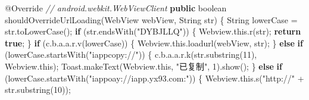 \documentclass[
]{article}
\newenvironment{Shaded}{}{}
\newcommand{\AttributeTok}[1]{\textcolor[rgb]{0.49,0.56,0.16}{#1}}
\newcommand{\BuiltInTok}[1]{\textcolor[rgb]{0.00,0.50,0.00}{#1}}
\newcommand{\CommentTok}[1]{\textcolor[rgb]{0.38,0.63,0.69}{\textit{#1}}}
\newcommand{\ControlFlowTok}[1]{\textcolor[rgb]{0.00,0.44,0.13}{\textbf{#1}}}
\newcommand{\DataTypeTok}[1]{\textcolor[rgb]{0.56,0.13,0.00}{#1}}
\newcommand{\DecValTok}[1]{\textcolor[rgb]{0.25,0.63,0.44}{#1}}
\newcommand{\FunctionTok}[1]{\textcolor[rgb]{0.02,0.16,0.49}{#1}}
\newcommand{\KeywordTok}[1]{\textcolor[rgb]{0.00,0.44,0.13}{\textbf{#1}}}
\newcommand{\NormalTok}[1]{#1}
\newcommand{\OperatorTok}[1]{\textcolor[rgb]{0.40,0.40,0.40}{#1}}
\newcommand{\StringTok}[1]{\textcolor[rgb]{0.25,0.44,0.63}{#1}}
\begin{document}
\begin{Shaded}
\begin{Highlighting}[]
        \AttributeTok{@Override} \CommentTok{// android.webkit.WebViewClient}
        \KeywordTok{public} \DataTypeTok{boolean} \FunctionTok{shouldOverrideUrlLoading}\OperatorTok{(}\NormalTok{WebView webView}\OperatorTok{,} \BuiltInTok{String}\NormalTok{ str}\OperatorTok{)} \OperatorTok{\{}
            \BuiltInTok{String}\NormalTok{ lowerCase }\OperatorTok{=}\NormalTok{ str}\OperatorTok{.}\FunctionTok{toLowerCase}\OperatorTok{();}
            \ControlFlowTok{if} \OperatorTok{(}\NormalTok{str}\OperatorTok{.}\FunctionTok{endsWith}\OperatorTok{(}\StringTok{"DYBJLLQ"}\OperatorTok{))} \OperatorTok{\{}
\NormalTok{                Webview}\OperatorTok{.}\FunctionTok{this}\OperatorTok{.}\FunctionTok{r}\OperatorTok{(}\NormalTok{str}\OperatorTok{);}
                \ControlFlowTok{return} \KeywordTok{true}\OperatorTok{;}
            \OperatorTok{\}}
            \ControlFlowTok{if} \OperatorTok{(}\NormalTok{c}\OperatorTok{.}\FunctionTok{b}\OperatorTok{.}\FunctionTok{a}\OperatorTok{.}\FunctionTok{a}\OperatorTok{.}\FunctionTok{r}\OperatorTok{.}\FunctionTok{v}\OperatorTok{(}\NormalTok{lowerCase}\OperatorTok{))} \OperatorTok{\{}
\NormalTok{                Webview}\OperatorTok{.}\FunctionTok{this}\OperatorTok{.}\FunctionTok{loadurl}\OperatorTok{(}\NormalTok{webView}\OperatorTok{,}\NormalTok{ str}\OperatorTok{);}
            \OperatorTok{\}} \ControlFlowTok{else} \ControlFlowTok{if} \OperatorTok{(}\NormalTok{lowerCase}\OperatorTok{.}\FunctionTok{startsWith}\OperatorTok{(}\StringTok{"iappcopy://"}\OperatorTok{))} \OperatorTok{\{}
\NormalTok{                c}\OperatorTok{.}\FunctionTok{b}\OperatorTok{.}\FunctionTok{a}\OperatorTok{.}\FunctionTok{a}\OperatorTok{.}\FunctionTok{r}\OperatorTok{.}\FunctionTok{k}\OperatorTok{(}\NormalTok{str}\OperatorTok{.}\FunctionTok{substring}\OperatorTok{(}\DecValTok{11}\OperatorTok{),}\NormalTok{ Webview}\OperatorTok{.}\FunctionTok{this}\OperatorTok{);}
\NormalTok{                Toast}\OperatorTok{.}\FunctionTok{makeText}\OperatorTok{(}\NormalTok{Webview}\OperatorTok{.}\FunctionTok{this}\OperatorTok{,} \StringTok{"已复制"}\OperatorTok{,} \DecValTok{1}\OperatorTok{).}\FunctionTok{show}\OperatorTok{();}
            \OperatorTok{\}} \ControlFlowTok{else} \ControlFlowTok{if} \OperatorTok{(}\NormalTok{lowerCase}\OperatorTok{.}\FunctionTok{startsWith}\OperatorTok{(}\StringTok{"iappoay://iapp.yx93.com:"}\OperatorTok{))} \OperatorTok{\{}
\NormalTok{                Webview}\OperatorTok{.}\FunctionTok{this}\OperatorTok{.}\FunctionTok{s}\OperatorTok{(}\StringTok{"http://"} \OperatorTok{+}\NormalTok{ str}\OperatorTok{.}\FunctionTok{substring}\OperatorTok{(}\DecValTok{10}\OperatorTok{));}

\end{Highlighting}
\end{Shaded}
\end{document}
